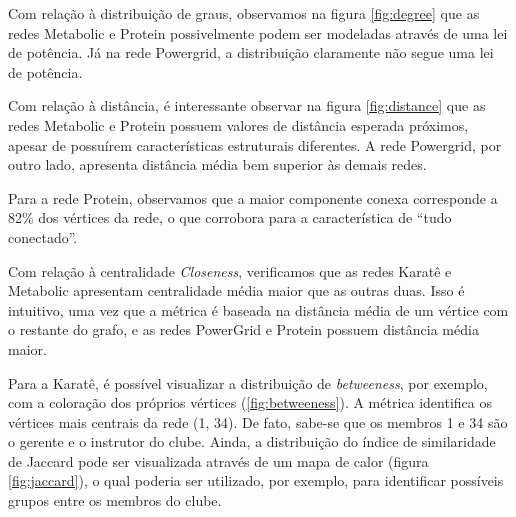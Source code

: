 \documentclass[12pt,a4paper]{article}
\begin{document}
	
	Com relação à distribuição de graus, observamos na figura \ref{fig:degree} que as redes Metabolic e Protein possivelmente podem ser modeladas através de uma lei de potência. Já na rede Powergrid, a distribuição claramente não segue uma lei de potência.
	
	Com relação à distância, é interessante observar na figura \ref{fig:distance} que as redes Metabolic e Protein possuem valores de distância esperada próximos, apesar de possuírem características estruturais diferentes. A rede Powergrid, por outro lado, apresenta distância média bem superior às demais redes.
	
	Para a rede Protein, observamos que a maior componente conexa corresponde a 82\% dos vértices da rede, o que corrobora para a característica de ``tudo conectado''.
	
	Com relação à centralidade \textit{Closeness}, verificamos que as redes Karatê e Metabolic apresentam centralidade média maior que as outras duas. Isso é intuitivo, uma vez que a métrica é baseada na distância média de um vértice com o restante do grafo, e as redes PowerGrid e Protein possuem distância média maior. 
	
	Para a Karatê, é possível visualizar a distribuição de \textit{betweeness}, por exemplo, com a coloração dos próprios vértices (\ref{fig:betweeness}). A métrica identifica os vértices mais centrais da rede (1, 34). De fato, sabe-se que os membros 1 e 34 são o gerente e o instrutor do clube. Ainda, a distribuição do índice de similaridade de Jaccard pode ser visualizada através de um mapa de calor (figura \ref{fig:jaccard}), o qual poderia ser utilizado, por exemplo, para identificar possíveis grupos entre os membros do clube.  
\end{document}
